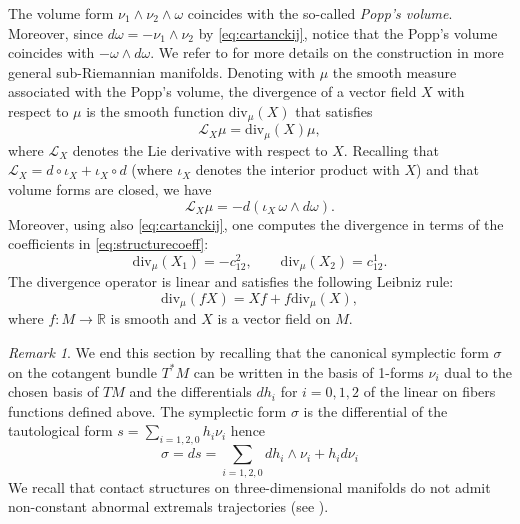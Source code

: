 \documentclass{amsart}
\theoremstyle{plain}
\theoremstyle{definition}
\theoremstyle{remark}
\newtheorem{remark}[thm]{Remark}
\newcommand{\R}{\mathbb{R}}
\newcommand{\diff}{d}%
\begin{document}
The volume form $\nu_1\wedge\nu_2\wedge\omega$ coincides with the so-called \emph{Popp's volume}. 
Moreover, since $\diff\omega=-\nu_1\wedge\nu_2$ by \eqref{eq:cartanckij}, notice that the Popp's volume coincides with $-\omega\wedge\diff\omega$. We refer to \cite{Popp} for more details on the construction in more general sub-Riemannian manifolds.
Denoting with $\mu$ the smooth measure associated with the Popp's volume, 
the divergence of a vector field $X$ with respect to $\mu$ is the smooth function $\mathrm{div}_\mu(X)$ that satisfies
\begin{equation}
	\mathcal{L}_X\mu=\mathrm{div}_\mu(X)\mu,
\end{equation}
where $\mathcal{L}_X$ denotes the Lie derivative with respect to $X$.
Recalling that $\mathcal{L}_X=\diff\circ \iota_{X}+\iota_{X}\circ \diff$ (where $\iota_{X}$ denotes the interior product with $X$) and that volume forms are closed, we have 
\begin{equation}
\label{Cartanvolume}
\mathcal{L}_X\mu=-\diff\left(\iota_X\,\omega\wedge\diff\omega\right).
\end{equation}
Moreover, using also \eqref{eq:cartanckij}, one computes the divergence in terms of the coefficients in \eqref{eq:structurecoeff}:
\begin{equation}
\label{eq:divXi}
\mathrm{div}_\mu(X_1)=-c^2_{12}, \qquad \mathrm{div}_\mu(X_2)=c^1_{12}.
\end{equation}
The divergence operator is linear and satisfies the following Leibniz rule:
\begin{equation}
\label{leibniz}
\mathrm{div}_\mu(fX)=Xf+f\mathrm{div}_\mu(X),
\end{equation}
where $f:M\to\R$ is smooth and $X$ is a vector field on $M$.


\begin{remark} We end this section by recalling that the canonical symplectic form $\sigma$ on the cotangent bundle $T^{*}M$ can be written in the basis of 1-forms $\nu_{i}$ dual to the chosen basis of $TM$ and the differentials $dh_{i}$ for $i=0,1,2$ of the linear on fibers functions defined above.
The symplectic  form $\sigma$ is the differential of the tautological form $s=\sum_{i=1,2,0} h_{i}\nu_{i}$ hence
$$\sigma=ds=\sum_{i=1,2,0} dh_{i}\wedge \nu_{i} + h_{i}d\nu_{i}$$
We recall that contact structures on three-dimensional manifolds do not admit non-constant abnormal extremals trajectories (see \cite[Proposition~4.38]{thebook}).
\end{remark}
\end{document}
